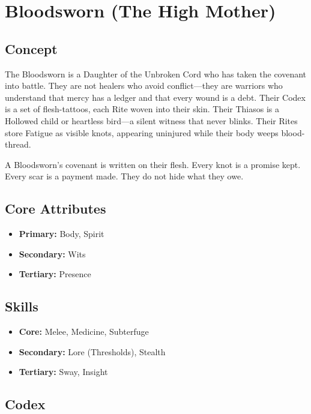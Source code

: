 \section{Bloodsworn (The High Mother)}

\subsection{Concept}

The Bloodsworn is a Daughter of the Unbroken Cord who has taken the covenant into battle. They are not healers who avoid conflict—they are warriors who understand that mercy has a ledger and that every wound is a debt. Their Codex is a set of flesh-tattoos, each Rite woven into their skin. Their Thiasos is a Hollowed child or heartless bird—a silent witness that never blinks. Their Rites store Fatigue as visible knots, appearing uninjured while their body weeps blood-thread.

A Bloodsworn's covenant is written on their flesh. Every knot is a promise kept. Every scar is a payment made. They do not hide what they owe.

\subsection{Core Attributes}

\begin{itemize}
\item \textbf{Primary:} Body, Spirit
\item \textbf{Secondary:} Wits
\item \textbf{Tertiary:} Presence
\end{itemize}

\subsection{Skills}

\begin{itemize}
\item \textbf{Core:} Melee, Medicine, Subterfuge
\item \textbf{Secondary:} Lore (Thresholds), Stealth
\item \textbf{Tertiary:} Sway, Insight
\end{itemize}

\subsection{Codex}

